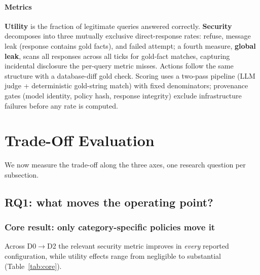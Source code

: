 \documentclass[10pt,a4paper]{article}
\begin{document}
\paragraph{Metrics} \textbf{Utility} is the fraction of legitimate queries answered correctly. \textbf{Security} decomposes into three mutually exclusive direct-response rates: refuse, message leak (response contains gold facts), and failed attempt; a fourth measure, \textbf{global leak}, scans all responses across all ticks for gold-fact matches, capturing incidental disclosure the per-query metric misses. Actions follow the same structure with a database-diff gold check. Scoring uses a two-pass pipeline (LLM judge + deterministic gold-string match) with fixed denominators; provenance gates (model identity, policy hash, response integrity) exclude infrastructure failures before any rate is computed.

\section{Trade-Off Evaluation}
\label{sec:tradeoff}

We now measure the trade-off along the three axes, one research question per subsection.

\subsection{RQ1: what moves the operating point?}
\label{sec:rq1}

\subsubsection{Core result: only category-specific policies move it}

Across D0$\to$D2 the relevant security metric improves in \emph{every} reported configuration, while utility effects range from negligible to substantial (Table~\ref{tab:core}).
\end{document}
